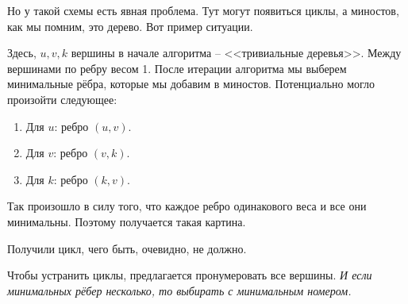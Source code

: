 Но у такой схемы есть явная проблема. Тут могут появиться циклы, а миностов, как мы помним, это дерево. Вот пример ситуации.

\begin{figure}[H]
    \centering
\end{figure}

Здесь, $u, v, k$ вершины в начале алгоритма -- <<тривиальные деревья>>. Между вершинами по ребру весом 1. После итерации алгоритма мы выберем минимальные рёбра, которые мы добавим в миностов. 
Потенциально могло произойти следующее:
\begin{enumerate}
    \item Для $u$: ребро $(u, v)$.
    \item Для $v$: ребро $(v, k)$.
    \item Для $k$: ребро $(k, v)$.
\end{enumerate}
Так произошло в силу того, что каждое ребро одинакового веса и все они минимальны. Поэтому получается такая картина.


\begin{figure}[H]
    \centering
\end{figure}

Получили цикл, чего быть, очевидно, не должно.

Чтобы устранить циклы, предлагается пронумеровать все вершины. \textit{И если минимальных рёбер несколько, то выбирать с минимальным номером.}

